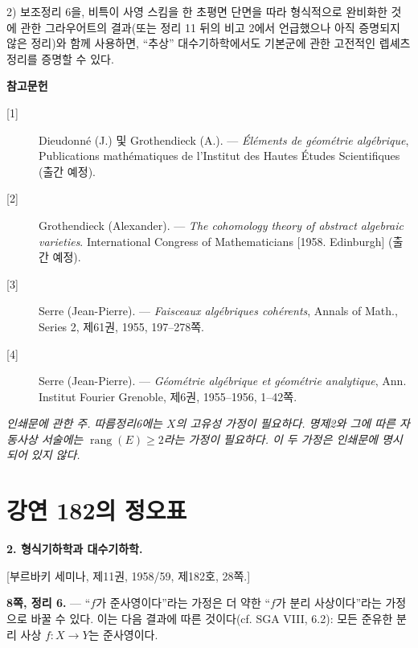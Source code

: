 \documentclass[11pt,twoside,openany]{book}
\numberwithin{equation}{section}
\newcommand{\sourceunit}{front}
\newcommand{\src}[1]{%
  \phantomsection\hypertarget{src:\sourceunit:#1}{}%
  \marginpar{\raggedleft\footnotesize\sffamily #1}%
}
\theoremstyle{plain}
\theoremstyle{definition}
\theoremstyle{remark}
\begin{document}
2) 보조정리 6을, 비특이 사영 스킴을 한 초평면 단면을 따라 형식적으로
완비화한 것에 관한 그라우어트의 결과(또는 정리 11 뒤의 비고 2에서
언급했으나 아직 증명되지 않은 정리)와 함께 사용하면, ``추상''
대수기하학에서도 기본군에 관한 고전적인 렙셰츠 정리를 증명할 수 있다.

\begin{center}
  \textbf{참고문헌}
\end{center}

\begin{description}
  \item[{[1]}] Dieudonné (J.) 및 Grothendieck (A.). --- \emph{Éléments de
    géométrie algébrique}, Publications mathématiques de l'Institut des Hautes
    Études Scientifiques (출간 예정).
  \item[{[2]}] Grothendieck (Alexander). --- \emph{The cohomology theory of
    abstract algebraic varieties}. International Congress of Mathematicians
    [1958. Edinburgh] (출간 예정).
  \item[{[3]}] Serre (Jean-Pierre). --- \emph{Faisceaux algébriques
    cohérents}, Annals of Math., Series 2, 제61권, 1955, 197--278쪽.
  \item[{[4]}] Serre (Jean-Pierre). --- \emph{Géométrie algébrique et
    géométrie analytique}, Ann. Institut Fourier Grenoble, 제6권, 1955--1956,
    1--42쪽.
\end{description}

\par\smallskip
\begingroup\footnotesize
\noindent\textit{인쇄문에 관한 주. 따름정리6에는 $X$의 고유성 가정이 필요하다. 명제2와 그에 따른 자동사상 서술에는 $\operatorname{rang}(E)\geq2$라는 가정이 필요하다. 이 두 가정은 인쇄문에 명시되어 있지 않다.}\par
\endgroup

\par
\renewcommand{\sourceunit}{e182}
\clearpage
\chapter*{강연 182의 정오표}
\setcounter{footnote}{1}
\src{298}

\noindent\textbf{2. 형식기하학과 대수기하학.}

\begin{center}
[부르바키 세미나, 제11권, 1958/59, 제182호, 28쪽.]
\end{center}

\noindent\textbf{8쪽, 정리 6.} --- ``$f$가 준사영이다''라는 가정은
더 약한 ``$f$가 분리 사상이다''라는 가정으로 바꿀 수 있다. 이는 다음
결과에 따른 것이다(cf. SGA VIII, 6.2): 모든 준유한 분리 사상
$f:X\longrightarrow Y$는 준사영이다.
\end{document}
